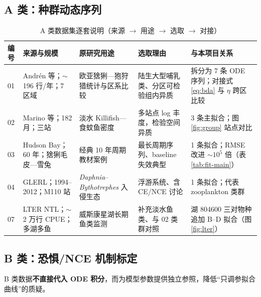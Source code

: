\documentclass[12pt,a4paper]{ctexart}
\begin{document}
\subsection{A 类：种群动态序列}

\begin{table}[H]
  \centering
  \caption{A 类数据集逐套说明（来源 $\rightarrow$ 用途 $\rightarrow$ 选取 $\rightarrow$ 对接）}
  \label{tab:data-A}
  \footnotesize
  \renewcommand{\arraystretch}{1.15}
  \begin{tabular}{p{0.7cm}p{2.0cm}p{2.8cm}p{2.8cm}p{5.0cm}}
    \toprule
    编号 & 来源与规模 & 原研究用途 & 选取理由 & 与本项目关系 \\
    \midrule
    01 &
    Andrén 等；$\sim$196 行/年；7 区域 &
    欧亚猞猁—狍狩猎统计与区系比较 &
    陆生大型哺乳类、分区可检验组内异质 &
    拆分为 7 条 ODE 序列；对接式\,\eqref{eq:bda} 与 $\eta$ 跨区比较 \\
    02 &
    Marino 等；182 月；三站 &
    淡水 Killifish—食蚊鱼密度 &
    多站点 log 丰度，检验空间异质 &
    3 条主拟合；图\,\ref{fig:group} 站点对比 \\
    03 &
    Hudson Bay；60 年；猞猁毛皮—雪兔 &
    经典 10 年周期教材案例 &
    最长周期序列、baseline 失效典型 &
    1 条拟合；RMSE 改进 $\sim 10^5$ 倍（表\,\ref{tab:fit-main}） \\
    04 &
    GLERL；1994--2012；M110 站 &
    \textit{Daphnia}--\textit{Bythotrephes} 入侵生态 &
    浮游系统、含 CE/NCE 讨论 &
    1 条拟合；代表 zooplankton 类群 \\
    07 &
    LTER NTL；$\sim$2 万行 CPUE；多湖多鱼 &
    威斯康星湖长期鱼类监测 &
    补充淡水鱼类、与 02 类群对照 &
    湖 804600 三对物种追加 B--D 拟合（图\,\ref{fig:lter}） \\
    \bottomrule
  \end{tabular}
\end{table}

\subsection{B 类：恐惧/NCE 机制标定}

B 类数据\textbf{不直接代入 ODE 积分}，而为模型参数提供独立参照，降低“只调参拟合曲线”的质疑。
\end{document}
